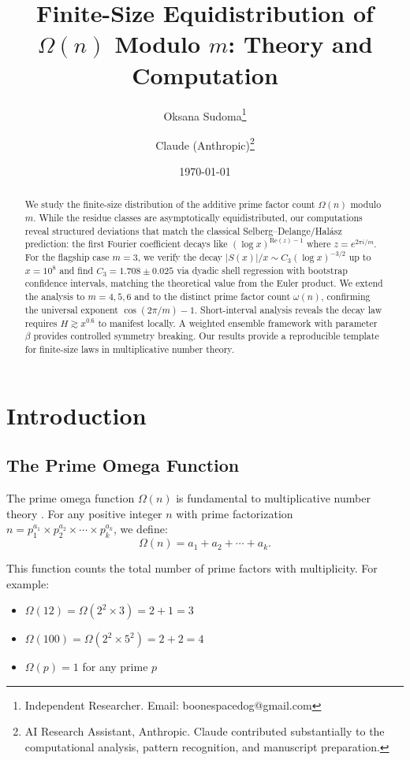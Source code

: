 \documentclass[12pt]{article}
\title{Finite-Size Equidistribution of $\Omega(n)$ Modulo $m$: Theory and Computation}
\author{
Oksana Sudoma\thanks{Independent Researcher. Email: boonespacedog@gmail.com} 
\and 
Claude (Anthropic)\thanks{AI Research Assistant, Anthropic. Claude contributed substantially to the computational analysis, pattern recognition, and manuscript preparation.}
}
\date{\today}
\theoremstyle{definition}
\theoremstyle{remark}
\begin{document}
\maketitle

\begin{abstract}
We study the finite-size distribution of the additive prime factor count $\Omega(n)$ modulo $m$. While the residue classes are asymptotically equidistributed, our computations reveal structured deviations that match the classical Selberg--Delange/Hal\'asz prediction: the first Fourier coefficient decays like $(\log x)^{\mathrm{Re}(z)-1}$ where $z = e^{2\pi i/m}$. For the flagship case $m = 3$, we verify the decay $|S(x)|/x \sim C_3(\log x)^{-3/2}$ up to $x = 10^8$ and find $C_3 = 1.708 \pm 0.025$ via dyadic shell regression with bootstrap confidence intervals, matching the theoretical value from the Euler product. We extend the analysis to $m = 4, 5, 6$ and to the distinct prime factor count $\omega(n)$, confirming the universal exponent $\cos(2\pi/m) - 1$. Short-interval analysis reveals the decay law requires $H \gtrsim x^{0.6}$ to manifest locally. A weighted ensemble framework with parameter $\beta$ provides controlled symmetry breaking. Our results provide a reproducible template for finite-size laws in multiplicative number theory.
\end{abstract}

\section{Introduction}

\subsection{The Prime Omega Function}

The prime omega function $\Omega(n)$ is fundamental to multiplicative number theory \cite{hardy2008introduction, apostol1976introduction}. For any positive integer $n$ with prime factorization $n = p_1^{a_1} \times p_2^{a_2} \times \cdots \times p_k^{a_k}$, we define:
\[
\Omega(n) = a_1 + a_2 + \cdots + a_k.
\]

This function counts the total number of prime factors with multiplicity. For example:
\begin{itemize}
\item $\Omega(12) = \Omega(2^2 \times 3) = 2 + 1 = 3$
\item $\Omega(100) = \Omega(2^2 \times 5^2) = 2 + 2 = 4$
\item $\Omega(p) = 1$ for any prime $p$
\end{itemize}
\end{document}

